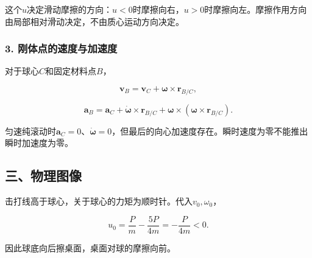 \documentclass[12pt,a4paper,fontset=fandol]{ctexart}
\begin{document}
这个\(u\)决定滑动摩擦的方向：\(u<0\)时摩擦向右，\(u>0\)时摩擦向左。摩擦作用方向由局部相对滑动决定，不由质心运动方向决定。

\subsubsection{3.
刚体点的速度与加速度}\label{ux521aux4f53ux70b9ux7684ux901fux5ea6ux4e0eux52a0ux901fux5ea6}

对于球心\(C\)和固定材料点\(B\)，

\[
\mathbf v_B=\mathbf v_C+\boldsymbol\omega\times\mathbf r_{B/C},
\]

\[
\mathbf a_B=\mathbf a_C+
\dot{\boldsymbol\omega}\times\mathbf r_{B/C}
+\boldsymbol\omega\times
(\boldsymbol\omega\times\mathbf r_{B/C}).
\]

匀速纯滚动时\(\mathbf a_C=0\)、\(\dot{\boldsymbol\omega}=0\)，但最后的向心加速度存在。瞬时速度为零不能推出瞬时加速度为零。

\subsection{三、物理图像}\label{ux4e09ux7269ux7406ux56feux50cf-1}

击打线高于球心，关于球心的力矩为顺时针。代入\(v_0,\omega_0\)，

\[
u_0=\frac Pm-\frac{5P}{4m}
=-\frac P{4m}<0.
\]

因此球底向后擦桌面，桌面对球的摩擦向前。

\begin{center}
\begin{minipage}{\linewidth}
\centering\begingroup{}
\ifdim\wd\diagrambox>.88\linewidth
\sbox{\diagrambox}{\resizebox{.88\linewidth}{!}{\usebox{\diagrambox}}}\fi
\ifdim\ht\diagrambox>.38\textheight
\resizebox{!}{.38\textheight}{\usebox{\diagrambox}}
\else\usebox{\diagrambox}\fi
\par{}\endgroup\end{minipage}\end{center}
\end{document}
